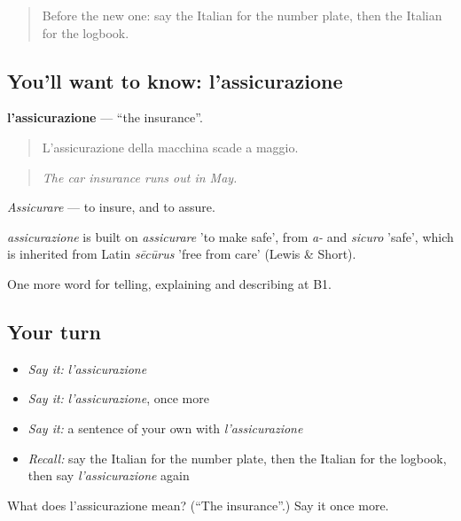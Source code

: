 \label{lesson:IT-C415-assicurazione}



\begin{quote}
Before the new one: say the Italian for the number plate, then the Italian for the logbook.
\end{quote}

\subsection*{You'll want to know: l'assicurazione}
\textbf{l'assicurazione} — \textquotedblleft{}the insurance\textquotedblright{}.

\begin{quote}
L'assicurazione della macchina scade a maggio.
\end{quote}

\begin{quote}
\emph{The car insurance runs out in May.}
\end{quote}

\emph{Assicurare} — to insure, and to assure.

\begin{cousinweb}
\emph{assicurazione} is built on \emph{assicurare} 'to make safe', from \emph{a-} and \emph{sicuro} 'safe', which is inherited from Latin \emph{sēcūrus} 'free from care' (Lewis \& Short).
\end{cousinweb}

\begin{grammarlens}[title={What you've built}]
One more word for telling, explaining and describing at B1.
\end{grammarlens}

\subsection*{Your turn}
\begin{itemize}
\raggedright
  \item \emph{Say it:} \emph{l'assicurazione}
  \item \emph{Say it:} \emph{l'assicurazione}, once more
  \item \emph{Say it:} a sentence of your own with \emph{l'assicurazione}
  \item \emph{Recall:} say the Italian for the number plate, then the Italian for the logbook, then say \emph{l'assicurazione} again
\end{itemize}

\begin{tcolorbox}[breakable,colback=teal!4,colframe=teal!35!black,title={Before you move on}]
What does l'assicurazione mean? (\textquotedblleft{}The insurance\textquotedblright{}.) Say it once more.
\end{tcolorbox}
